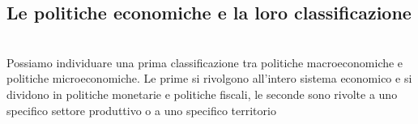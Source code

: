 \documentclass{report}
\begin{document}
\subsection{Le politiche economiche e la loro classificazione}
\\
Possiamo individuare una prima classificazione tra politiche macroeconomiche e politiche microeconomiche.
Le prime si rivolgono all'intero sistema economico e si dividono in politiche monetarie e politiche fiscali, le seconde sono rivolte a uno specifico settore produttivo o a uno specifico territorio
\\
\end{document}
